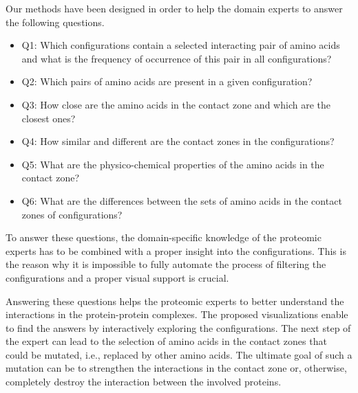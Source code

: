 \documentclass{bmcart}
\begin{document}
Our methods have been designed in order to help the domain experts to answer the following questions.
\begin{itemize}
\item Q1: Which configurations contain a selected interacting pair of amino acids and what is the frequency of occurrence of this pair in all configurations?
\item Q2: Which pairs of amino acids are present in a given configuration?
\item Q3: How close are the amino acids in the contact zone and which are the closest ones?
\item Q4: How similar and different are the contact zones in the configurations?
\item Q5: What are the physico-chemical properties of the amino acids in the contact zone?
\item Q6: What are the differences between the sets of amino acids in the contact zones of configurations?
\end{itemize}

To answer these questions, the domain-specific knowledge of the proteomic experts has to be combined with a proper insight into the configurations.
This is the reason why it is impossible to fully automate the process of filtering the configurations and a proper visual support is crucial.

Answering these questions helps the proteomic experts to better understand the interactions in the protein-protein complexes.
The proposed visualizations enable to find the answers by interactively exploring the configurations.
The next step of the expert can lead to the selection of amino acids in the contact zones that could be mutated, i.e., replaced by other amino acids.
The ultimate goal of such a mutation can be to strengthen the interactions in the contact zone or, otherwise, completely destroy the interaction between the involved proteins.

\end{document}
